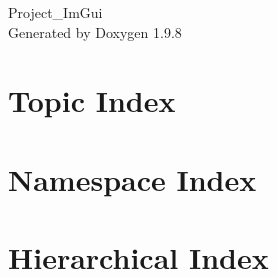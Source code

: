 \documentclass[twoside]{book}
\newcommand{\+}{\discretionary{\mbox{\scriptsize$\hookleftarrow$}}{}{}}
\newcommand{\clearemptydoublepage}{%
    \newpage{\pagestyle{empty}\cleardoublepage}%
  }
\begin{document}
  \raggedbottom
    \hypersetup{pageanchor=false,
                bookmarksnumbered=true,
                pdfencoding=unicode
               }
  \begin{titlepage}
  \vspace*{7cm}
  \begin{center}%
  {\Large Project\+\_\+\+Im\+Gui}\\
  \vspace*{1cm}
  {\large Generated by Doxygen 1.9.8}\\
  \end{center}
  \end{titlepage}
  \clearemptydoublepage
  \tableofcontents
  \clearemptydoublepage
  \hypersetup{pageanchor=true}


































\chapter{Topic Index}

\chapter{Namespace Index}

\chapter{Hierarchical Index}

\end{document}
